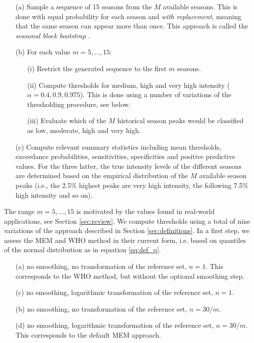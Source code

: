\documentclass[12pt]{article}
\begin{document}
\begin{itemize}
\item[(a)] Sample a sequence of 15 seasons from the $M$ available seasons. This is done with equal probability for each season and \textit{with replacement}, meaning that the same season can appear more than once. This approach is called the \textit{seasonal block bootstrap} \citep{Politis2001}.
\item[(b)] For each value $m = 5, \dots, 15$:
\begin{itemize}
\item[(i)] Restrict the generated sequence to the first $m$ seasons.
\item[(ii)] Compute thresholds for medium, high and very high intensity ($\alpha = 0.4, 0.9, 0.975$). This is done using a number of variations of the thresholding procedure, see below.
\item[(iii)] Evaluate which of the $M$ historical season peaks would be classified as low, moderate, high and very high.
\end{itemize}
\item[(c)] Compute relevant summary statistics including mean thresholds, exceedance probabilities, sensitivities, specificities and positive predictive values. For the three latter, the true intensity levels of the different seasons are determined based on the empirical distribution of the $M$ available season peaks (i.e., the 2.5\% highest peaks are very high intensity, the following 7.5\% high intensity and so on).
\end{itemize}
The range $m =5, \dots, 15$ is motivated by the values found in real-world applications, see Section \ref{sec:review}. We compute thresholds using a total of nine variations of the approach described in Section \ref{sec:definitions}. In a first step, we assess the MEM and WHO method in their current form, i.e. based on quantiles of the normal distribution as in equation \eqref{eq:def_q}.
\begin{enumerate}
\item[(a)] no smoothing, no transformation of the reference set, $n = 1$. This corresponds to the WHO method, but without the optional smoothing step.
\item[(c)] no smoothing, logarithmic transformation of the reference set, $n = 1$.
\item[(b)] no smoothing, no transformation of the reference set, $n = 30/m$.
\item[(d)] no smoothing, logarithmic transformation of the reference set, $n = 30/m$. This corresponds to the default MEM approach.
\end{enumerate}
\end{document}
